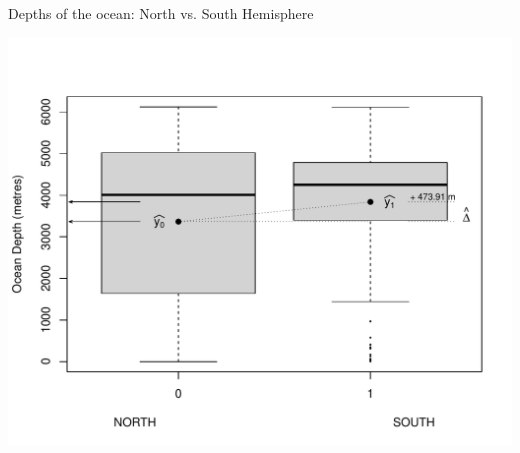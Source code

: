\documentclass[10pt]{beamer}\usepackage[]{graphicx}\usepackage[]{color}
\makeatletter
\def\maxwidth{ %
  \ifdim\Gin@nat@width>\linewidth
    \linewidth
  \else
    \Gin@nat@width
  \fi
}
\newenvironment{knitrout}{}{} %
\makeatother
\begin{document}
\begin{frame}[fragile]{Depths of the ocean: North vs. South Hemisphere}
	
\begin{knitrout}\tiny
{}\color{fgcolor}

{\centering \includegraphics[width=\maxwidth]{figure/unnamed-chunk-5-1} 

}


\end{knitrout}
	
	
\end{frame}
\end{document}
